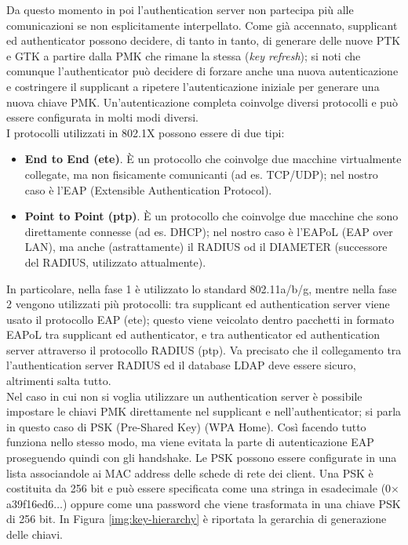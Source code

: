 Da questo momento in poi l'authentication server non partecipa più alle comunicazioni se non esplicitamente interpellato. Come già accennato, supplicant ed authenticator possono decidere, di tanto in tanto, di generare delle nuove PTK e GTK a partire dalla PMK che rimane la stessa (\textit{key refresh}); si noti che comunque l'authenticator può decidere di forzare anche una nuova autenticazione e costringere il supplicant a ripetere l'autenticazione iniziale per generare una nuova chiave PMK. Un'autenticazione completa coinvolge diversi protocolli e può essere configurata in molti modi diversi.\\
I protocolli utilizzati in 802.1X possono essere di due tipi:
\begin{itemize}
	\item \textbf{End to End (ete)}. È un protocollo che coinvolge due macchine virtualmente collegate, ma non fisicamente comunicanti (ad es. TCP/UDP); nel nostro caso è l'EAP (Extensible Authentication Protocol).
	\item \textbf{Point to Point (ptp)}. È un protocollo che coinvolge due macchine che sono direttamente connesse (ad es. DHCP); nel nostro caso è l'EAPoL (EAP over LAN), ma anche (astrattamente) il RADIUS od il DIAMETER (successore del RADIUS, utilizzato attualmente).
\end{itemize}
In particolare, nella fase 1 è utilizzato lo standard 802.11a/b/g, mentre nella fase 2 vengono utilizzati più protocolli: tra supplicant ed authentication server viene usato il protocollo EAP (ete); questo viene veicolato dentro pacchetti in formato EAPoL tra supplicant ed authenticator, e tra authenticator ed authentication server attraverso il protocollo RADIUS (ptp). Va precisato che il collegamento tra l'authentication server RADIUS ed il database LDAP deve essere sicuro, altrimenti salta tutto.\\
Nel caso in cui non si voglia utilizzare un authentication server è possibile impostare le chiavi PMK direttamente nel supplicant e nell'authenticator; si parla in questo caso di PSK (Pre-Shared Key) (WPA Home). Così facendo tutto funziona nello stesso modo, ma viene evitata la parte di autenticazione EAP proseguendo quindi con gli handshake. Le PSK possono essere configurate in una lista associandole ai MAC address delle schede di rete dei client. Una PSK è costituita da 256 bit e può essere specificata come una stringa in esadecimale (0$\times$a39f16ed6$\dots$) oppure come una password che viene trasformata in una chiave PSK di 256 bit. In Figura \ref{img:key-hierarchy} è riportata la gerarchia di generazione delle chiavi.
